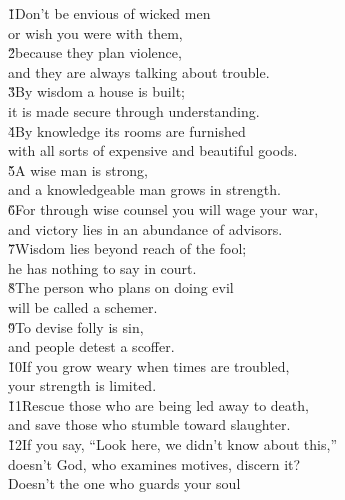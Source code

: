 \begin{poetry}
\poeml {}
\v{1}Don't be envious of wicked men \\
\poeml or wish you were with them, \\
\poeml \v{2}because they plan violence, \\
\poemll    and they are always talking about trouble. \\
\poeml \v{3}By wisdom a house is built; \\
\poemll    it is made secure through understanding. \\
\poeml \v{4}By knowledge its rooms are furnished \\
\poemll    with all sorts of expensive and beautiful goods. \\
\poeml \v{5}A wise man is strong, \\
\poemll    and a knowledgeable man grows in strength. \\
\poeml \v{6}For through wise counsel you will wage your war, \\
\poemll    and victory lies in an abundance of advisors. \\
\poeml \v{7}Wisdom lies beyond reach of the fool; \\
\poemll    he has nothing to say in court. \\
\poeml \v{8}The person who plans on doing evil \\
\poemll    will be called a schemer. \\
\poeml \v{9}To devise folly is sin, \\
\poemll    and people detest a scoffer. \\
\poeml \v{10}If you grow weary when times are troubled, \\
\poemll    your strength is limited. \\
\poeml \v{11}Rescue those who are being led away to death, \\
\poemll    and save those who stumble toward slaughter. \\
\poeml \v{12}If you say, ``Look here, we didn't know about this,'' \\
\poemll    doesn't God, who examines motives, discern it? \\
\poeml Doesn't the one who guards your soul \\

\end{poetry}
